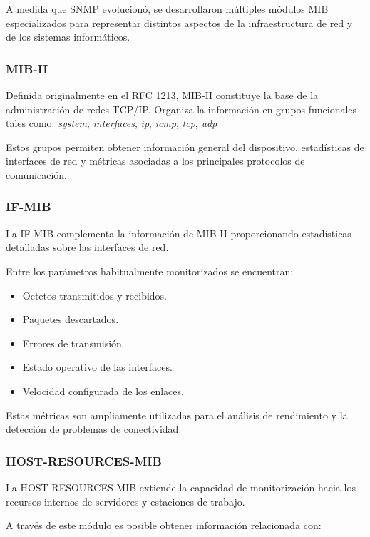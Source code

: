 A medida que SNMP evolucionó, se desarrollaron múltiples módulos MIB especializados para representar distintos aspectos de la infraestructura de red y de los sistemas informáticos.

\subsubsection{MIB-II}

Definida originalmente en el RFC 1213, MIB-II constituye la base de la administración de redes TCP/IP. Organiza la información en grupos funcionales tales como: \textit{system},
\textit{interfaces}, \textit{ip}, \textit{icmp}, \textit{tcp}, \textit{udp}


Estos grupos permiten obtener información general del dispositivo, estadísticas de interfaces de red y métricas asociadas a los principales protocolos de comunicación.

\subsubsection{IF-MIB}

La IF-MIB complementa la información de MIB-II proporcionando estadísticas detalladas sobre las interfaces de red.

Entre los parámetros habitualmente monitorizados se encuentran:

\begin{itemize}
\item Octetos transmitidos y recibidos.
\item Paquetes descartados.
\item Errores de transmisión.
\item Estado operativo de las interfaces.
\item Velocidad configurada de los enlaces.
\end{itemize}

Estas métricas son ampliamente utilizadas para el análisis de rendimiento y la detección de problemas de conectividad.

\subsubsection{HOST-RESOURCES-MIB}

La HOST-RESOURCES-MIB extiende la capacidad de monitorización hacia los recursos internos de servidores y estaciones de trabajo.

A través de este módulo es posible obtener información relacionada con:

